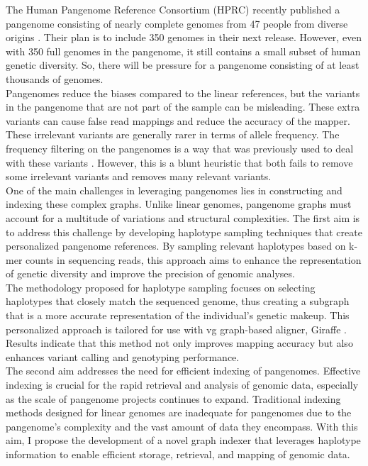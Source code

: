 \documentclass[11pt]{ucthesis}
\begin{document}
The Human Pangenome Reference Consortium (HPRC) recently published a pangenome consisting of nearly complete genomes from 47 people from diverse origins \cite{liao2023draft,wang2022human}. Their plan is to include 350 genomes in their next release. However, even with 350 full genomes in the pangenome, it still contains a small subset of human genetic diversity. So, there will be pressure for a pangenome consisting of at least thousands of genomes.\\
Pangenomes reduce the biases compared to the linear references, but the variants in the pangenome that are not part of the sample can be misleading. These extra variants can cause false read mappings and reduce the accuracy of the mapper. These irrelevant variants are generally rarer in terms of allele frequency. The frequency filtering on the pangenomes is a way that was previously used to deal with these variants \cite{liao2023draft}. However, this is a blunt heuristic that both fails to remove some irrelevant variants and removes many relevant variants.\\
One of the main challenges in leveraging pangenomes lies in constructing and indexing these complex graphs. Unlike linear genomes, pangenome graphs must account for a multitude of variations and structural complexities. The first aim is to address this challenge by developing haplotype sampling techniques that create personalized pangenome references. By sampling relevant haplotypes based on k-mer counts in sequencing reads, this approach aims to enhance the representation of genetic diversity and improve the precision of genomic analyses.\\
The methodology proposed for haplotype sampling focuses on selecting haplotypes that closely match the sequenced genome, thus creating a subgraph that is a more accurate representation of the individual's genetic makeup. This personalized approach is tailored for use with vg graph-based aligner, Giraffe \cite{siren2021pangenomics}. Results indicate that this method not only improves mapping accuracy but also enhances variant calling and genotyping performance.\\
The second aim addresses the need for efficient indexing of pangenomes. Effective indexing is crucial for the rapid retrieval and analysis of genomic data, especially as the scale of pangenome projects continues to expand. Traditional indexing methods designed for linear genomes are inadequate for pangenomes due to the pangenome's complexity and the vast amount of data they encompass. With this aim, I propose the development of a novel graph indexer that leverages haplotype information to enable efficient storage, retrieval, and mapping of genomic data.\\
\end{document}
